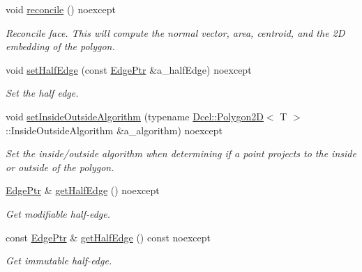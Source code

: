 \begin{DoxyCompactItemize}
void \hyperlink{classDcel_1_1FaceT_aaf3f8b92ca4393391ea213b0ecfe19bd}{reconcile} () noexcept
\begin{DoxyCompactList}\small\item\em Reconcile face. This will compute the normal vector, area, centroid, and the 2D embedding of the polygon. \end{DoxyCompactList}\item 
void \hyperlink{classDcel_1_1FaceT_a2680477d0a6c8b2187230170522fe3a5}{set\+Half\+Edge} (const \hyperlink{classDcel_1_1FaceT_a0f3448c4cf108341e48029b8040c7cec}{Edge\+Ptr} \&a\+\_\+half\+Edge) noexcept
\begin{DoxyCompactList}\small\item\em Set the half edge. \end{DoxyCompactList}\item 
void \hyperlink{classDcel_1_1FaceT_a12b6dc8412276137532a63c292e4b6fe}{set\+Inside\+Outside\+Algorithm} (typename \hyperlink{classDcel_1_1Polygon2D}{Dcel\+::\+Polygon2D}$<$ T $>$\+::Inside\+Outside\+Algorithm \&a\+\_\+algorithm) noexcept
\begin{DoxyCompactList}\small\item\em Set the inside/outside algorithm when determining if a point projects to the inside or outside of the polygon. \end{DoxyCompactList}\item 
\mbox{\label{classDcel_1_1FaceT_a121a02750336ee4050bfd5db8f9328b4}} 
\hyperlink{classDcel_1_1FaceT_a0f3448c4cf108341e48029b8040c7cec}{Edge\+Ptr} \& \hyperlink{classDcel_1_1FaceT_a121a02750336ee4050bfd5db8f9328b4}{get\+Half\+Edge} () noexcept
\begin{DoxyCompactList}\small\item\em Get modifiable half-\/edge. \end{DoxyCompactList}\item 
\mbox{\label{classDcel_1_1FaceT_a1b273c8c0157f7ec9604424a2b073db3}} 
const \hyperlink{classDcel_1_1FaceT_a0f3448c4cf108341e48029b8040c7cec}{Edge\+Ptr} \& \hyperlink{classDcel_1_1FaceT_a1b273c8c0157f7ec9604424a2b073db3}{get\+Half\+Edge} () const noexcept
\begin{DoxyCompactList}\small\item\em Get immutable half-\/edge. \end{DoxyCompactList}\item 
\mbox{\label{classDcel_1_1FaceT_a1b9c15538b2d7840a11b30f5e236c2a9}} 

\end{DoxyCompactItemize}
